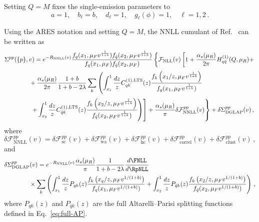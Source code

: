 Setting $Q=M$ fixes the single-emission parameters to
\begin{equation}
\label{eq:LTS-1-emsn}
	a=1, \quad b_\ell=b, \quad d_\ell=1, \quad g_\ell(\phi)=1,\quad \ell=1,2\,.
\end{equation}

Using the \textsc{ARES} notation and setting $Q=M$, the NNLL cumulant of
Ref.~\cite{vanBeekveld:2025zjh} can be written as
\begin{equation}
\label{eq:LTS-cum}
\begin{aligned}
&\Sigma^{pp}(\{p\},v)=e^{-R_{\mathrm{NNLL}}(v)}
\frac{f_q(x_1,\mu_F v^{\frac{1}{1+b}})f_{\bar q}(x_{2},\mu_F v^{\frac{1}{1+b}})}
{f_q(x_1,\mu_F )f_{\bar q}(x_{2},\mu_F )}\left\{\mathcal{F}_{\mathrm{NLL}}(v)\left[
1+\frac{\alpha_s(\mu_R)}{2\pi}H_{q\bar q}^{(1)}(Q,\mu_R)+
\right.\right.\\[0.5ex]
&\qquad\qquad +\frac{\alpha_s(\mu_R)}{2\pi}\frac{1+b}{1+b-2\lambda}
\sum_k\left(
\int_{x_1}^1\frac{dz}{z}C_{qk}^{(1), \rm LTS}(z)
\frac{f_k\left(x_1/z,\mu_F v^{\frac{1}{1+b}}\right)}{f_{ q}(x_1,\mu_F v^{\frac{1}{1+b}})}\right.\\[0.5ex]
&\qquad\qquad\left.\left.\left.+\int_{x_2}^1\frac{dz}{z}C_{\bar{q}k}^{(1), \rm LTS}(z)
\frac{f_k\left(x_2/z,\mu_F v^{\frac{1}{1+b}}\right)}{f_{\bar{q}}(x_2,\mu_F v^{\frac{1}{1+b}})}\right)\right]+\frac{\alpha_s(\mu_R)}{\pi}\delta\mathcal{F}^{ pp}_{\mathrm{NNLL}}(v)\right\}+\delta\Sigma_{\mathrm{DGLAP}}^{pp}(v)\,,
\end{aligned}
\end{equation}
where 
\begin{equation}
\label{eq:NNLL-LTS}
	\delta\mathcal{F}^{pp}_{\mathrm{NNLL}}(v)=\delta\mathcal{F}^{pp}_{\mathrm{sc}}(v)+\delta\mathcal{F}^{pp}_{\mathrm{wa}}(v)+\delta\mathcal{F}^{pp}_{\mathrm{hc}}(v)+\delta\mathcal{F}^{pp}_{\mathrm{correl}}(v)+\delta\mathcal{F}^{pp}_{\mathrm{clust}}(v)\,,
\end{equation}
and
\begin{equation}
\label{eq:DGLAP-add}
\begin{aligned}
	&\delta\Sigma_{\mathrm{DGLAP}}^{pp}(v)=e^{-R_{\mathrm{NNLL}}(v)}\frac{\alpha_s(\mu_R)}{\pi}\frac{1}{1+b-2\lambda}\frac{d\FNLL}{d\RpNLL}\\
	&\qquad\qquad\times\sum_k\left(
\int_{x_1}^1\frac{dz}{z}P_{qk}(z)
\frac{f_k\left(x_q/z,\mu_F v^{1/(1+b)}\right)}{f_{ q}(x_{1},\mu_F v^{1/(1+b)})}
+\int_{x_2}^1\frac{dz}{z}P_{\bar{q}k}(z)
\frac{f_k\left(x_{2}/z,\mu_F v^{1/(1+b)}\right)}{f_{\bar{q}}(x_{2},\mu_F v^{1/(1+b)})}
\right)\,,
\end{aligned}
\end{equation}
where $P_{qk}(z)$ and $P_{\bar q k}(z)$ are the full Altarelli--Parisi
splitting functions defined in Eq.~\eqref{eq:full-AP}.

